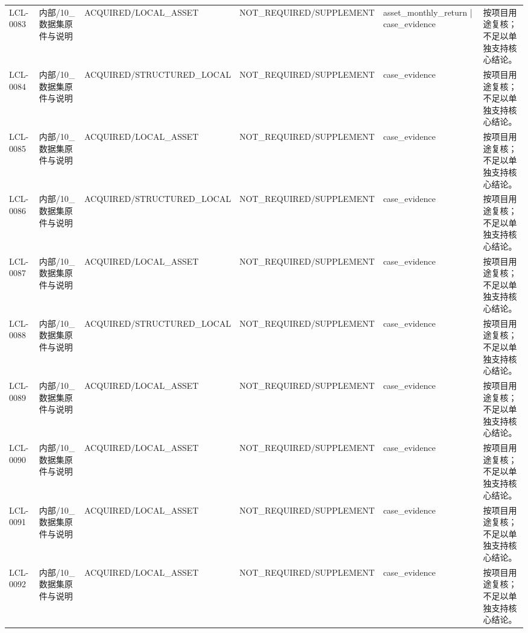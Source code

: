 \begin{landscape}
\begin{longtable}{p{1.8cm}p{2.6cm}p{2.6cm}p{2.6cm}p{4.8cm}p{7.2cm}}
LCL-0083 & 内部/\allowbreak{}10\_\allowbreak{}数据集原件与说明 & ACQUIRED/\allowbreak{}LOCAL\_\allowbreak{}ASSET & NOT\_\allowbreak{}REQUIRED/\allowbreak{}SUPPLEMENT & asset\_\allowbreak{}monthly\_\allowbreak{}return | case\_\allowbreak{}evidence & 按项目用途复核；不足以单独支持核心结论。\\
LCL-0084 & 内部/\allowbreak{}10\_\allowbreak{}数据集原件与说明 & ACQUIRED/\allowbreak{}STRUCTURED\_\allowbreak{}LOCAL & NOT\_\allowbreak{}REQUIRED/\allowbreak{}SUPPLEMENT & case\_\allowbreak{}evidence & 按项目用途复核；不足以单独支持核心结论。\\
LCL-0085 & 内部/\allowbreak{}10\_\allowbreak{}数据集原件与说明 & ACQUIRED/\allowbreak{}LOCAL\_\allowbreak{}ASSET & NOT\_\allowbreak{}REQUIRED/\allowbreak{}SUPPLEMENT & case\_\allowbreak{}evidence & 按项目用途复核；不足以单独支持核心结论。\\
LCL-0086 & 内部/\allowbreak{}10\_\allowbreak{}数据集原件与说明 & ACQUIRED/\allowbreak{}STRUCTURED\_\allowbreak{}LOCAL & NOT\_\allowbreak{}REQUIRED/\allowbreak{}SUPPLEMENT & case\_\allowbreak{}evidence & 按项目用途复核；不足以单独支持核心结论。\\
LCL-0087 & 内部/\allowbreak{}10\_\allowbreak{}数据集原件与说明 & ACQUIRED/\allowbreak{}LOCAL\_\allowbreak{}ASSET & NOT\_\allowbreak{}REQUIRED/\allowbreak{}SUPPLEMENT & case\_\allowbreak{}evidence & 按项目用途复核；不足以单独支持核心结论。\\
LCL-0088 & 内部/\allowbreak{}10\_\allowbreak{}数据集原件与说明 & ACQUIRED/\allowbreak{}STRUCTURED\_\allowbreak{}LOCAL & NOT\_\allowbreak{}REQUIRED/\allowbreak{}SUPPLEMENT & case\_\allowbreak{}evidence & 按项目用途复核；不足以单独支持核心结论。\\
LCL-0089 & 内部/\allowbreak{}10\_\allowbreak{}数据集原件与说明 & ACQUIRED/\allowbreak{}LOCAL\_\allowbreak{}ASSET & NOT\_\allowbreak{}REQUIRED/\allowbreak{}SUPPLEMENT & case\_\allowbreak{}evidence & 按项目用途复核；不足以单独支持核心结论。\\
LCL-0090 & 内部/\allowbreak{}10\_\allowbreak{}数据集原件与说明 & ACQUIRED/\allowbreak{}LOCAL\_\allowbreak{}ASSET & NOT\_\allowbreak{}REQUIRED/\allowbreak{}SUPPLEMENT & case\_\allowbreak{}evidence & 按项目用途复核；不足以单独支持核心结论。\\
LCL-0091 & 内部/\allowbreak{}10\_\allowbreak{}数据集原件与说明 & ACQUIRED/\allowbreak{}LOCAL\_\allowbreak{}ASSET & NOT\_\allowbreak{}REQUIRED/\allowbreak{}SUPPLEMENT & case\_\allowbreak{}evidence & 按项目用途复核；不足以单独支持核心结论。\\
LCL-0092 & 内部/\allowbreak{}10\_\allowbreak{}数据集原件与说明 & ACQUIRED/\allowbreak{}LOCAL\_\allowbreak{}ASSET & NOT\_\allowbreak{}REQUIRED/\allowbreak{}SUPPLEMENT & case\_\allowbreak{}evidence & 按项目用途复核；不足以单独支持核心结论。\\

\end{longtable}
\end{landscape}
